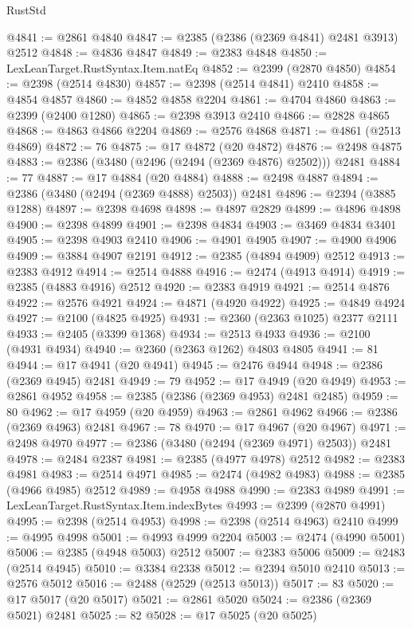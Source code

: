 \begin{lexlean}{RustStd}
\begin{coremodule}
@4841 := @2861 @4840
@4847 := @2385 (@2386 (@2369 @4841) @2481 @3913) @2512
@4848 := @4836 @4847
@4849 := @2383 @4848
@4850 := LexLeanTarget.RustSyntax.Item.natEq
@4852 := @2399 (@2870 @4850)
@4854 := @2398 (@2514 @4830)
@4857 := @2398 (@2514 @4841) @2410
@4858 := @4854 @4857
@4860 := @4852 @4858 @2204
@4861 := @4704 @4860
@4863 := @2399 (@2400 @1280)
@4865 := @2398 @3913 @2410
@4866 := @2828 @4865
@4868 := @4863 @4866 @2204
@4869 := @2576 @4868
@4871 := @4861 (@2513 @4869)
@4872 := 76
@4875 := @17 @4872 (@20 @4872)
@4876 := @2498 @4875
@4883 := @2386 (@3480 (@2496 (@2494 (@2369 @4876) @2502))) @2481
@4884 := 77
@4887 := @17 @4884 (@20 @4884)
@4888 := @2498 @4887
@4894 := @2386 (@3480 (@2494 (@2369 @4888) @2503)) @2481
@4896 := @2394 (@3885 @1288)
@4897 := @2398 @4698
@4898 := @4897 @2829
@4899 := @4896 @4898
@4900 := @2398 @4899
@4901 := @2398 @4834
@4903 := @3469 @4834 @3401
@4905 := @2398 @4903 @2410
@4906 := @4901 @4905
@4907 := @4900 @4906
@4909 := @3884 @4907 @2191
@4912 := @2385 (@4894 @4909) @2512
@4913 := @2383 @4912
@4914 := @2514 @4888
@4916 := @2474 (@4913 @4914)
@4919 := @2385 (@4883 @4916) @2512
@4920 := @2383 @4919
@4921 := @2514 @4876
@4922 := @2576 @4921
@4924 := @4871 (@4920 @4922)
@4925 := @4849 @4924
@4927 := @2100 (@4825 @4925)
@4931 := @2360 (@2363 @1025) @2377 @2111
@4933 := @2405 (@3399 @1368)
@4934 := @2513 @4933
@4936 := @2100 (@4931 @4934)
@4940 := @2360 (@2363 @1262) @4803 @4805
@4941 := 81
@4944 := @17 @4941 (@20 @4941)
@4945 := @2476 @4944
@4948 := @2386 (@2369 @4945) @2481
@4949 := 79
@4952 := @17 @4949 (@20 @4949)
@4953 := @2861 @4952
@4958 := @2385 (@2386 (@2369 @4953) @2481 @2485)
@4959 := 80
@4962 := @17 @4959 (@20 @4959)
@4963 := @2861 @4962
@4966 := @2386 (@2369 @4963) @2481
@4967 := 78
@4970 := @17 @4967 (@20 @4967)
@4971 := @2498 @4970
@4977 := @2386 (@3480 (@2494 (@2369 @4971) @2503)) @2481
@4978 := @2484 @2387
@4981 := @2385 (@4977 @4978) @2512
@4982 := @2383 @4981
@4983 := @2514 @4971
@4985 := @2474 (@4982 @4983)
@4988 := @2385 (@4966 @4985) @2512
@4989 := @4958 @4988
@4990 := @2383 @4989
@4991 := LexLeanTarget.RustSyntax.Item.indexBytes
@4993 := @2399 (@2870 @4991)
@4995 := @2398 (@2514 @4953)
@4998 := @2398 (@2514 @4963) @2410
@4999 := @4995 @4998
@5001 := @4993 @4999 @2204
@5003 := @2474 (@4990 @5001)
@5006 := @2385 (@4948 @5003) @2512
@5007 := @2383 @5006
@5009 := @2483 (@2514 @4945)
@5010 := @3384 @2338
@5012 := @2394 @5010 @2410
@5013 := @2576 @5012
@5016 := @2488 (@2529 (@2513 @5013))
@5017 := 83
@5020 := @17 @5017 (@20 @5017)
@5021 := @2861 @5020
@5024 := @2386 (@2369 @5021) @2481
@5025 := 82
@5028 := @17 @5025 (@20 @5025)

\end{coremodule}
\end{lexlean}
